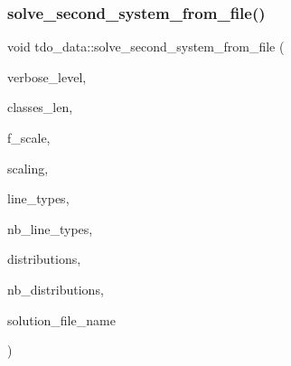 \subsubsection{\texorpdfstring{solve\+\_\+second\+\_\+system\+\_\+from\+\_\+file()}{solve\_second\_system\_from\_file()}}
{\footnotesize\ttfamily void tdo\+\_\+data\+::solve\+\_\+second\+\_\+system\+\_\+from\+\_\+file (\begin{DoxyParamCaption}\item[{\mbox{\hyperlink{galois_8h_a09fddde158a3a20bd2dcadb609de11dc}{I\+NT}}}]{verbose\+\_\+level,  }\item[{\mbox{\hyperlink{galois_8h_a09fddde158a3a20bd2dcadb609de11dc}{I\+NT}} $\ast$}]{classes\+\_\+len,  }\item[{\mbox{\hyperlink{galois_8h_a09fddde158a3a20bd2dcadb609de11dc}{I\+NT}}}]{f\+\_\+scale,  }\item[{\mbox{\hyperlink{galois_8h_a09fddde158a3a20bd2dcadb609de11dc}{I\+NT}}}]{scaling,  }\item[{\mbox{\hyperlink{galois_8h_a09fddde158a3a20bd2dcadb609de11dc}{I\+NT}} $\ast$\&}]{line\+\_\+types,  }\item[{\mbox{\hyperlink{galois_8h_a09fddde158a3a20bd2dcadb609de11dc}{I\+NT}} \&}]{nb\+\_\+line\+\_\+types,  }\item[{\mbox{\hyperlink{galois_8h_a09fddde158a3a20bd2dcadb609de11dc}{I\+NT}} $\ast$\&}]{distributions,  }\item[{\mbox{\hyperlink{galois_8h_a09fddde158a3a20bd2dcadb609de11dc}{I\+NT}} \&}]{nb\+\_\+distributions,  }\item[{\mbox{\hyperlink{galois_8h_ab6cc7b4aeb6ea31aba2b3fbfc83ff5e6}{B\+Y\+TE}} $\ast$}]{solution\+\_\+file\+\_\+name }\end{DoxyParamCaption})}

\mbox{\label{classtdo__data_a4feb5aa7d2fb44863579b0cf45502f44}} 
